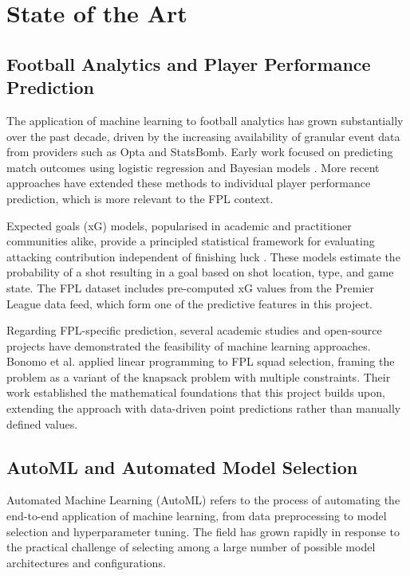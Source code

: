 \documentclass[11pt,english,listoffigures,listoftables]{tfgetsinf}
\begin{document}

\chapter{State of the Art}
\label{chap:stateoftheart}

\section{Football Analytics and Player Performance Prediction}

The application of machine learning to football analytics has grown substantially over the past decade, driven by the increasing availability of granular event data from providers such as Opta and StatsBomb. Early work focused on predicting match outcomes using logistic regression and Bayesian models \cite{dixon_coles}. More recent approaches have extended these methods to individual player performance prediction, which is more relevant to the FPL context.

Expected goals (xG) models, popularised in academic and practitioner communities alike, provide a principled statistical framework for evaluating attacking contribution independent of finishing luck \cite{xg_model}. These models estimate the probability of a shot resulting in a goal based on shot location, type, and game state. The FPL dataset includes pre-computed xG values from the Premier League data feed, which form one of the predictive features in this project.

Regarding FPL-specific prediction, several academic studies and open-source projects have demonstrated the feasibility of machine learning approaches. Bonomo et al. \cite{bonomo} applied linear programming to FPL squad selection, framing the problem as a variant of the knapsack problem with multiple constraints. Their work established the mathematical foundations that this project builds upon, extending the approach with data-driven point predictions rather than manually defined values.

\section{AutoML and Automated Model Selection}

Automated Machine Learning (AutoML) refers to the process of automating the end-to-end application of machine learning, from data preprocessing to model selection and hyperparameter tuning. The field has grown rapidly in response to the practical challenge of selecting among a large number of possible model architectures and configurations.
\end{document}
